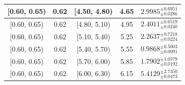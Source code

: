 \begin{longtable}{|c|c|c|c|c|}
\hline
[0.60, 0.65) & 0.62 & [4.50, 4.80) & 4.65 & $2.9985^{ \pm 0.6951 }_{ \pm 0.0286 }$ \\ 
\hline
[0.60, 0.65) & 0.62 & [4.80, 5.10) & 4.95 & $2.4011^{ \pm 0.6519 }_{ \pm 0.0240 }$ \\ 
\hline
[0.60, 0.65) & 0.62 & [5.10, 5.40) & 5.25 & $2.2637^{ \pm 0.7218 }_{ \pm 0.0224 }$ \\ 
\hline
[0.60, 0.65) & 0.62 & [5.40, 5.70) & 5.55 & $0.9868^{ \pm 0.5003 }_{ \pm 0.0091 }$ \\ 
\hline
[0.60, 0.65) & 0.62 & [5.70, 6.00) & 5.85 & $1.7902^{ \pm 1.0579 }_{ \pm 0.0192 }$ \\ 
\hline
[0.60, 0.65) & 0.62 & [6.00, 6.30) & 6.15 & $5.4129^{ \pm 2.7350 }_{ \pm 0.0473 }$ \\ 
\hline
\end{longtable}
\endgroup
